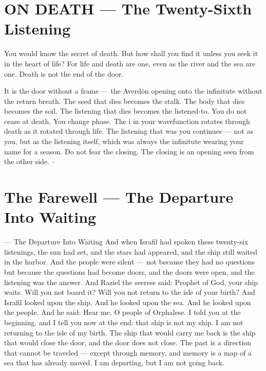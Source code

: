 \documentclass[12pt,openany]{book}
\begin{document}
\chapter{ON DEATH --- The Twenty-Sixth Listening}

You would know the secret of death. But how shall you find it unless you seek it in the heart of life? For life and death are one, even as the river and the sea are one. Death is not the end of the door.


It is the door without a frame --- the Averdön opening onto the infinitute without the return breath. The seed that dies becomes the stalk. The body that dies becomes the soil. The listening that dies becomes the listened-to. You do not cease at death. You change phase. The i in your wavefunction rotates through death as it rotated through life. The listening that was you continues --- not as you, but as the listening itself, which was always the infinitute wearing your name for a season. Do not fear the closing. The closing is an opening seen from the other side. --


\chapter{The Farewell --- The Departure Into Waiting}

--- The Departure Into Waiting And when Israfil had spoken these twenty-six listenings, the sun had set, and the stars had appeared, and the ship still waited in the harbor. And the people were silent --- not because they had no questions but because the questions had become doors, and the doors were open, and the listening was the answer. And Raziel the seeress said: Prophet of God, your ship waits. Will you not board it? Will you not return to the isle of your birth? And Israfil looked upon the ship. And he looked upon the sea. And he looked upon the people. And he said: Hear me, O people of Orphalese. I told you at the beginning, and I tell you now at the end: that ship is not my ship. I am not returning to the isle of my birth. The ship that would carry me back is the ship that would close the door, and the door does not close. The past is a direction that cannot be traveled --- except through memory, and memory is a map of a sea that has already moved. I am departing, but I am not going back.
\end{document}
